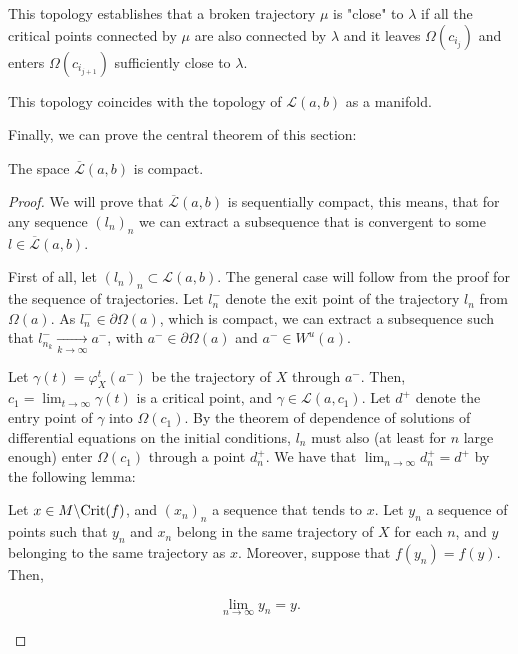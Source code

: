 This topology establishes that a broken trajectory $\mu$ is "close" to $\lambda$ if all the critical points connected by $\mu$ are also connected by $\lambda$ and it leaves $\Omega(c_{i_j})$ and enters $\Omega(c_{i_{j+1}})$ sufficiently close to $\lambda$.

\begin{rmrk}
This topology coincides with the topology of $\mathcal{L}(a,b)$ as a manifold.
\end{rmrk}

Finally, we can prove the central theorem of this section:

\begin{theo}
The space $\overline{\mathcal{L}}(a,b)$ is compact.
\end{theo}

\begin{proof}
We will prove that $\overline{\mathcal{L}}(a,b)$ is sequentially compact, this means, that for any sequence $(l_n)_n$ we can extract a subsequence that is convergent to some $l \in \overline{\mathcal{L}}(a,b)$.

First of all, let $(l_n)_n \subset \mathcal{L}(a,b)$. The general case will follow from the proof for the sequence of trajectories. Let $l_n^{-}$ denote the exit point of the trajectory $l_n$ from $\Omega(a)$. As $l_n^- \in \partial \Omega(a)$, which is compact, we can extract a subsequence such that $l_{n_k}^- \xrightarrow[k \rightarrow \infty]{} a^-$, with $a^- \in \partial \Omega(a)$ and $a^- \in W^u(a)$.

Let $\gamma(t) = \varphi^t_X(a^-)$ be the trajectory of $X$ through $a^-$. Then, $c_1 = \lim_{t \rightarrow \infty} \gamma(t)$ is a critical point, and $\gamma \in \mathcal{L}(a,c_1)$. Let $d^+$ denote the entry point of $\gamma$ into $\Omega(c_1)$. By the theorem of dependence of solutions of differential equations on the initial conditions, $l_n$ must also (at least for $n$ large enough) enter $\Omega(c_1)$ through a point $d_n^+$. We have that $\lim_{n \rightarrow \infty} d_n^+ = d^+$ by the following lemma:

\begin{lema}
Let $x \in M \backslash \text{Crit}(f)$, and $(x_n)_n$ a sequence that tends to $x$. Let $y_n$ a sequence of points such that $y_n$ and $x_n$ belong in the same trajectory of $X$ for each $n$, and $y$ belonging to the same trajectory as $x$. Moreover, suppose that $f(y_n) = f(y)$. Then,

$$\lim_{n \rightarrow \infty} y_n = y .$$
\end{lema}


\end{proof}

